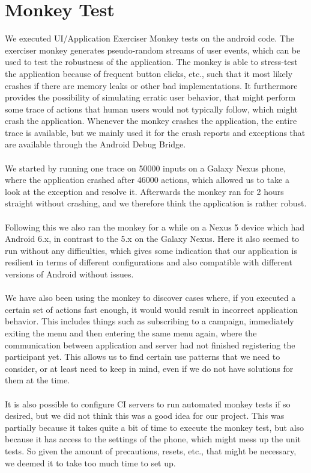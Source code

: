 \section{Monkey Test}
\label{sec:monkey_test}
We executed UI/Application Exerciser Monkey tests on the android code. The exerciser monkey generates pseudo-random streams of user events, which can be used to test the robustness of the application. The monkey is able to stress-test the application because of frequent button clicks, etc., such that it most likely crashes if there are memory leaks or other bad implementations. It furthermore provides the possibility of simulating erratic user behavior, that might perform some trace of actions that human users would not typically follow, which might crash the application. Whenever the monkey crashes the application, the entire trace is available, but we mainly used it for the crash reports and exceptions that are available through the Android Debug Bridge. 
\\\\
We started by running one trace on 50000 inputs on a Galaxy Nexus phone, where the application crashed after 46000 actions, which allowed us to take a look at the exception and resolve it. Afterwards the monkey ran for 2 hours straight without crashing, and we therefore think the application is rather robust.
\\\\
Following this we also ran the monkey for a while on a Nexus 5 device which had Android 6.x, in contrast to the 5.x on the Galaxy Nexus. Here it also seemed to run without any difficulties, which gives some indication that our application is resilient in terms of different configurations and also compatible with different versions of Android without issues.
\\\\
We have also been using the monkey to discover cases where, if you executed a certain set of actions fast enough, it would would result in incorrect application behavior. This includes things such as subscribing to a campaign, immediately exiting the menu and then entering the same menu again, where the communication between application and server had not finished registering the participant yet. This allows us to find certain use patterns that we need to consider, or at least need to keep in mind, even if we do not have solutions for them at the time.
\\\\
It is also possible to configure CI servers to run automated monkey tests if so desired, but we did not think this was a good idea for our project. This was partially because it takes quite a bit of time to execute the monkey test, but also because it has access to the settings of the phone, which might mess up the unit tests. So given the amount of precautions, resets, etc., that might be necessary, we deemed it to take too much time to set up. 

